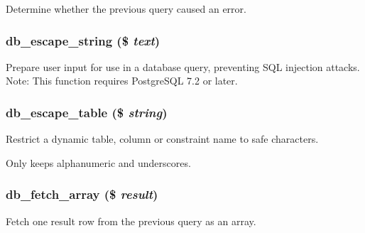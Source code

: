 Determine whether the previous query caused an error. \hypertarget{group__database_gf7e6977f59f6a23327521ae3a89346f5}{
\subsubsection[{db\_\-escape\_\-string}]{\setlength{\rightskip}{0pt plus 5cm}db\_\-escape\_\-string (\$ {\em text})}}
\label{group__database_gf7e6977f59f6a23327521ae3a89346f5}


Prepare user input for use in a database query, preventing SQL injection attacks. Note: This function requires PostgreSQL 7.2 or later. \hypertarget{group__database_g5f9fd89ca517eed3dfd7f128c3d65dd1}{
\subsubsection[{db\_\-escape\_\-table}]{\setlength{\rightskip}{0pt plus 5cm}db\_\-escape\_\-table (\$ {\em string})}}
\label{group__database_g5f9fd89ca517eed3dfd7f128c3d65dd1}


Restrict a dynamic table, column or constraint name to safe characters.

Only keeps alphanumeric and underscores. \hypertarget{group__database_g2bd5f98fec7f21ee2c37f6b83785dcb9}{
\subsubsection[{db\_\-fetch\_\-array}]{\setlength{\rightskip}{0pt plus 5cm}db\_\-fetch\_\-array (\$ {\em result})}}
\label{group__database_g2bd5f98fec7f21ee2c37f6b83785dcb9}


Fetch one result row from the previous query as an array.

